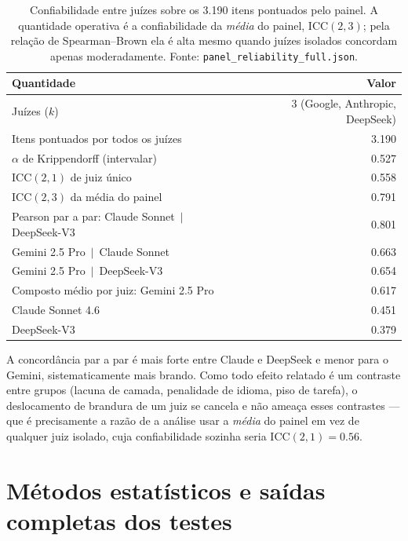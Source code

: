 \documentclass[11pt,a4paper]{article}
\begin{document}
\begin{table}[h]\centering
\caption{Confiabilidade entre juízes sobre os 3.190 itens pontuados pelo painel. A
quantidade operativa é a confiabilidade da \emph{média} do painel, ICC$(2,3)$;
pela relação de Spearman--Brown ela é alta mesmo quando juízes isolados concordam
apenas moderadamente. Fonte: \texttt{panel\_reliability\_full.json}.}
\label{tab:s-confiabilidade}
\small
\begin{tabular}{lr}
\toprule
Quantidade & Valor \\
\midrule
Juízes ($k$) & 3 (Google, Anthropic, DeepSeek) \\
Itens pontuados por todos os juízes & 3.190 \\
$\alpha$ de Krippendorff (intervalar) & 0.527 \\
ICC$(2,1)$ de juiz único & 0.558 \\
ICC$(2,3)$ da média do painel & 0.791 \\
\midrule
Pearson par a par: Claude Sonnet $\,\vert\,$ DeepSeek-V3 & 0.801 \\
\quad Gemini 2.5 Pro $\,\vert\,$ Claude Sonnet & 0.663 \\
\quad Gemini 2.5 Pro $\,\vert\,$ DeepSeek-V3 & 0.654 \\
\midrule
Composto médio por juiz: Gemini 2.5 Pro & 0.617 \\
\quad Claude Sonnet 4.6 & 0.451 \\
\quad DeepSeek-V3 & 0.379 \\
\bottomrule
\end{tabular}
\end{table}

A concordância par a par é mais forte entre Claude e DeepSeek e menor para o
Gemini, sistematicamente mais brando. Como todo efeito relatado é um contraste
entre grupos (lacuna de camada, penalidade de idioma, piso de tarefa), o
deslocamento de brandura de um juiz se cancela e não ameaça esses contrastes ---
que é precisamente a razão de a análise usar a \emph{média} do painel em vez de
qualquer juiz isolado, cuja confiabilidade sozinha seria ICC$(2,1)=0.56$.

\section{Métodos estatísticos e saídas completas dos testes}\label{sec:s-stats}
\end{document}
